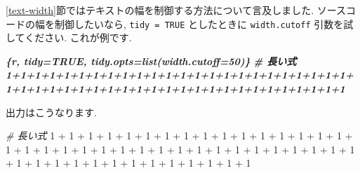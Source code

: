 \documentclass[
  11pt,
  lualatex,ja=standard,jafont=noto]{bxjsreport}
\newenvironment{Shaded}{\begin{snugshade}}{\end{snugshade}}
\newcommand{\CommentTok}[1]{\textcolor[rgb]{0.56,0.35,0.01}{\textit{#1}}}
\newcommand{\DecValTok}[1]{\textcolor[rgb]{0.00,0.00,0.81}{#1}}
\newcommand{\InformationTok}[1]{\textcolor[rgb]{0.56,0.35,0.01}{\textbf{\textit{#1}}}}
\newcommand{\SpecialCharTok}[1]{\textcolor[rgb]{0.00,0.00,0.00}{#1}}
\begin{document}
\ref{text-width}節ではテキストの幅を制御する方法について言及しました. ソースコードの幅を制御したいなら, \texttt{tidy = TRUE} としたときに \texttt{width.cutoff} 引数を試してください. これが例です.

\begin{Shaded}
\begin{Highlighting}[]
\InformationTok{\textasciigrave{}\textasciigrave{}\textasciigrave{}\{r, tidy=TRUE, tidy.opts=list(width.cutoff=50)\}}
\InformationTok{\# 長い式}
\InformationTok{1+1+1+1+1+1+1+1+1+1+1+1+1+1+1+1+1+1+1+1+1+1+1+1+}
\InformationTok{1+1+1+1+1+1+1+1+1+1+1+1+1+1+1+1+1+1+1+1+1+1+1+1}
\InformationTok{\textasciigrave{}\textasciigrave{}\textasciigrave{}}
\end{Highlighting}
\end{Shaded}

出力はこうなります.

\begin{Shaded}
\begin{Highlighting}[numbers=left,,]
\CommentTok{\# 長い式}
\DecValTok{1} \SpecialCharTok{+} \DecValTok{1} \SpecialCharTok{+} \DecValTok{1} \SpecialCharTok{+} \DecValTok{1} \SpecialCharTok{+} \DecValTok{1} \SpecialCharTok{+} \DecValTok{1} \SpecialCharTok{+} \DecValTok{1} \SpecialCharTok{+} \DecValTok{1} \SpecialCharTok{+} \DecValTok{1} \SpecialCharTok{+} \DecValTok{1} \SpecialCharTok{+} \DecValTok{1} \SpecialCharTok{+} \DecValTok{1} \SpecialCharTok{+} \DecValTok{1} \SpecialCharTok{+} 
  \DecValTok{1} \SpecialCharTok{+} \DecValTok{1} \SpecialCharTok{+} \DecValTok{1} \SpecialCharTok{+} \DecValTok{1} \SpecialCharTok{+} \DecValTok{1} \SpecialCharTok{+} \DecValTok{1} \SpecialCharTok{+} \DecValTok{1} \SpecialCharTok{+} \DecValTok{1} \SpecialCharTok{+} \DecValTok{1} \SpecialCharTok{+} \DecValTok{1} \SpecialCharTok{+} \DecValTok{1} \SpecialCharTok{+} \DecValTok{1} \SpecialCharTok{+} 
  \DecValTok{1} \SpecialCharTok{+} \DecValTok{1} \SpecialCharTok{+} \DecValTok{1} \SpecialCharTok{+} \DecValTok{1} \SpecialCharTok{+} \DecValTok{1} \SpecialCharTok{+} \DecValTok{1} \SpecialCharTok{+} \DecValTok{1} \SpecialCharTok{+} \DecValTok{1} \SpecialCharTok{+} \DecValTok{1} \SpecialCharTok{+} \DecValTok{1} \SpecialCharTok{+} \DecValTok{1} \SpecialCharTok{+} \DecValTok{1} \SpecialCharTok{+} 
  \DecValTok{1} \SpecialCharTok{+} \DecValTok{1} \SpecialCharTok{+} \DecValTok{1} \SpecialCharTok{+} \DecValTok{1} \SpecialCharTok{+} \DecValTok{1} \SpecialCharTok{+} \DecValTok{1} \SpecialCharTok{+} \DecValTok{1} \SpecialCharTok{+} \DecValTok{1} \SpecialCharTok{+} \DecValTok{1} \SpecialCharTok{+} \DecValTok{1} \SpecialCharTok{+} \DecValTok{1}
\end{Highlighting}
\end{Shaded}
\end{document}

